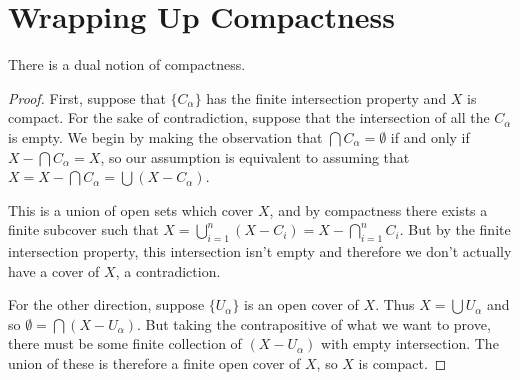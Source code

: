 
\section*{Wrapping Up Compactness}

There is a dual notion of compactness.  


\begin{proof}
	
	First, suppose that $\{C_\alpha\}$ has the finite intersection property and $X$ is compact.  For the sake of contradiction, suppose that the intersection of all the $C_\alpha$ is empty.  We begin by making the observation that $\bigcap C_\alpha = \emptyset$ if and only if $X{-}\bigcap C_\alpha = X$, so our assumption is equivalent to assuming that $X=X{-}\bigcap C_\alpha = \bigcup (X{-}C_\alpha)$.
	
	This is a union of open sets which cover $X$, and by compactness there exists a finite subcover such that $X=\bigcup\limits_{i=1}^n (X{-}C_i) = X{-}\bigcap\limits_{i=1}^n C_i$.  But by the finite intersection property, this intersection isn't empty and therefore we don't actually have a cover of $X$, a contradiction.
	
	For the other direction, suppose $\{U_\alpha\}$ is an open cover of $X$.  Thus $X=\bigcup U_\alpha$ and so $\emptyset = \bigcap(X{-}U_\alpha)$.  But taking the contrapositive of what we want to prove, there must be some finite collection of $(X{-}U_\alpha)$ with empty intersection.  The union of these is therefore a finite open cover of $X$, so $X$ is compact.
	
	
	
	
\end{proof}




